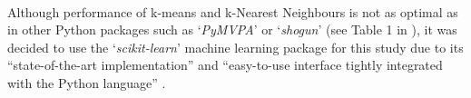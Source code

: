 \paragraph{ }Although performance of k-means and k-Nearest Neighbours is not as optimal as in other Python packages such as `\textit{PyMVPA}' \cite{PyMVPA} or `\textit{shogun}' \cite{Shogun} (see Table 1 in \cite{Pedregosa2011}), it was decided to use the `\textit{scikit-learn}' machine learning package for this study due to its ``state-of-the-art implementation'' and ``easy-to-use interface tightly integrated with the Python language'' \cite{Pedregosa2011}. 
